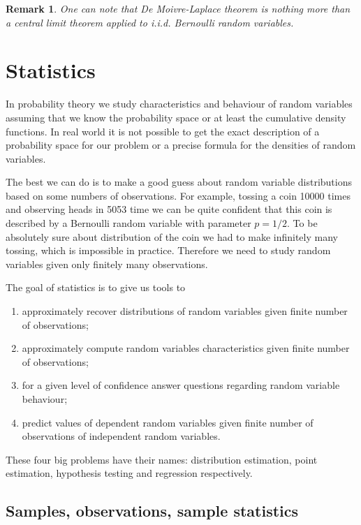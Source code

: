 \documentclass[12pt]{article}
\newtheorem{remark}[theorem]{Remark}
\begin{document}
\begin{remark} One can note that De Moivre-Laplace theorem is nothing more than a central limit theorem applied to i.i.d. Bernoulli random variables.
\end{remark}

\section{Statistics}

In probability theory we study characteristics and behaviour of random variables assuming that we know the probability space or at least the cumulative density functions. In real world it is not possible to get the exact description of a probability space for our problem or a precise formula for the densities of random variables. 

The best we can do is to make a good guess about random variable distributions based on some numbers of observations. For example, tossing a coin 10000 times and observing heads in 5053 time we can be quite confident that this coin is described by a Bernoulli random variable with parameter $p=1/2$. To be absolutely sure about distribution of the coin we had to make infinitely many tossing, which is impossible in practice. Therefore we need to study random variables given only finitely many observations. 

The goal of statistics is to give us tools to
\begin{enumerate}
    \item approximately recover distributions of random variables given finite number of observations;
    \item approximately compute random variables characteristics given finite number of observations;
    \item for a given level of confidence answer questions regarding random variable behaviour;
    \item predict values of dependent random variables given finite number of observations of independent random variables.
\end{enumerate}
These four big problems have their names: distribution estimation, point estimation, hypothesis testing and regression respectively.

\subsection{Samples, observations, sample statistics}
\end{document}
